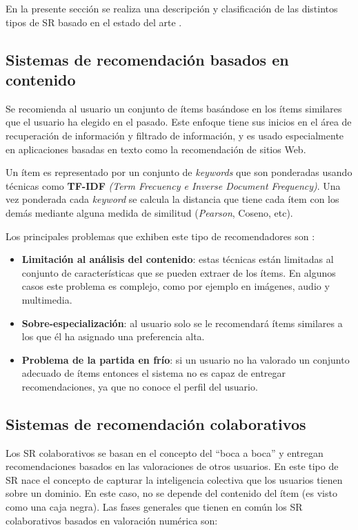 En la presente sección se realiza una descripción y clasificación de las distintos tipos de SR basado en el estado del arte \citep{Adomavicius:2005}.

\subsection{Sistemas de recomendaci\'on basados en contenido}
\label{marco:srcontenido}

Se recomienda al usuario un conjunto de ítems basándose en los ítems similares que el usuario ha elegido en el pasado. Este enfoque tiene sus inicios en el área de recuperación de información y filtrado de información, y es usado especialmente en aplicaciones basadas en texto como la recomendación de sitios Web.

Un ítem es representado por un conjunto de \textit{keywords} que son ponderadas usando técnicas como \textbf{TF-IDF} \textit{(Term Frecuency e Inverse Document Frequency)}. Una vez ponderada cada \textit{keyword} se calcula la distancia que tiene cada ítem con los demás mediante alguna medida de similitud (\textit{Pearson}, Coseno, etc).

Los principales problemas que exhiben este tipo de recomendadores son \citep{Adomavicius:2005}:

\begin{itemize}
	\item \textbf{Limitación al análisis del contenido}: estas técnicas están limitadas al conjunto de características que se pueden extraer de los ítems. En algunos casos este problema es complejo, como por ejemplo en imágenes, audio y multimedia.
	\item \textbf{Sobre-especialización}: al usuario solo se le recomendará ítems similares a los que él ha asignado una preferencia alta.  
	\item \textbf{Problema de la partida en frío}: si un usuario no ha valorado un conjunto adecuado de ítems entonces el sistema no es capaz de entregar recomendaciones, ya que no conoce el perfil del usuario.
\end{itemize}

\subsection{Sistemas de recomendaci\'on colaborativos}

Los SR colaborativos se basan en el concepto del ``boca a boca'' y entregan recomendaciones basados en las valoraciones de otros usuarios. En este tipo de SR nace el concepto de capturar la inteligencia colectiva que los usuarios tienen sobre un dominio. En este caso, no se depende del contenido del ítem (es visto como una caja negra). Las fases generales que tienen en común los SR colaborativos basados en valoración numérica son:

